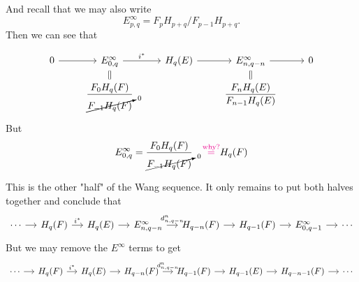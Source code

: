 \documentclass{article}
\numberwithin{equation}{section}
\begin{document}
And recall that we may also write
\[E^\infty_{p,q}=F_pH_{p+q}/F_{p-1}H_{p+q}.\]
Then we can see that
\iffalse\[\begin{tikzcd}[row sep=small]
	0\arrow[r]&E^\infty_{0,p+n-1}\arrow[d,equal]\arrow[r]&H_{p+n-1}(E)\arrow[r]&E^\infty_{n,q-1}\arrow[r]\arrow[d,equal]&0\\
		  &\dfrac{F_0H_{p+n-1}(F)}{\cancelto{0}{F_{-1}H_{p+n-1}(F)}} &&\dfrac{F_nH_{p+n-1}}{F_{n-1}H_{p+n-1}}
\end{tikzcd}\]\fi
\[\begin{tikzcd}[row sep=small]
	0\arrow[r]&E^\infty_{0,q}\arrow[d,equal]\arrow[r,"i^*"]&H_{q}(E)\arrow[r]&E^\infty_{n,q-n}\arrow[r]\arrow[d,equal]&0\\
		  &\dfrac{F_0H_{q}(F)}{\cancelto{0}{F_{-1}H_{q}(F)}} &&\dfrac{F_nH_{q}(E)}{F_{n-1}H_{q}(E)}
\end{tikzcd}\]
But 
\[E^\infty_{0,q}=\dfrac{F_0H_{q}(F)}{\cancelto{0}{F_{-1}H_{q}(F)}}{\color{magenta}\quad \overset{\text{why?}}{=}}H_{q}(F)\]
\iffalse
	these groups are just {\color{magenta}(why?)}
\[\begin{tikzcd}[row sep=small]
	0\arrow[r]&E^\infty_{0,q}\arrow[d,equal,magenta]\arrow[r]&H_{q}(E)\arrow[r]\arrow[d,equal]&E^\infty_{n,q-n}\arrow[r]\arrow[d,equal,magenta]&0\\
	0\arrow[r]&H_q(F)\arrow[r]&H_{q}(E)\arrow[r]&H_{q-n}(F)\arrow[r]&0
\end{tikzcd}\]\fi
This is the other "half" of the Wang sequence. It only remains to put both halves together and conclude that
\[\begin{tikzcd}[column sep=small]
	\cdots\arrow[r]&H_{q}(F)\arrow[r,"i^*"]&H_{q}(E)\arrow[r]&E^{\infty}_{n,q-n}\arrow[r,"d^n_{n,q-n}"]&H_{q-n}(F)\arrow[r]&H_{q-1}(F)\arrow[r]&E^\infty_{0,q-1}\arrow[r]&\cdots
\end{tikzcd}\]
But we may remove the $E^\infty$ terms to get
\[\begin{tikzcd}[column sep=small]
	\cdots\arrow[r]&H_{q}(F)\arrow[r,"i^*"]&H_{q}(E)\arrow[r]&H_{q-n}(F)\arrow[r,"d^n_{n,q-n}"]&H_{q-1}(F)\arrow[r]&H_{q-1}(E)\arrow[r]&H_{q-n-1}(F)\arrow[r]&\cdots
\end{tikzcd}\]
\end{document}
